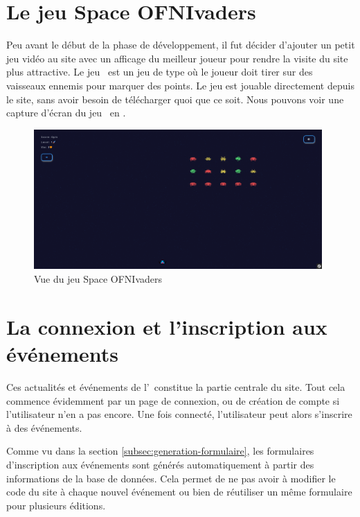 \section{Le jeu Space OFNIvaders}
\label{sec:jeu}

Peu avant le début de la phase de développement, il fut décider d'ajouter un petit jeu vidéo au site avec un afficage du meilleur joueur pour rendre la visite du site plus attractive. Le jeu \game\ est un jeu de type  où le joueur doit tirer sur des vaisseaux ennemis pour marquer des points. Le jeu est jouable directement depuis le site, sans avoir besoin de télécharger quoi que ce soit. Nous pouvons voir une capture d'écran du jeu \game\ en .
\bigskip


\begin{figure}[h]
    \centering
    \includegraphics[width=11cm]{assets/pictures/game.png}
    \caption{Vue du jeu Space OFNIvaders}
    \label{fig:game}
\end{figure}
\bigskip


\section{La connexion et l'inscription aux événements}
\label{sec:connexion-inscription}

Ces actualités et événements de l'\ofni\ constitue la partie centrale du site. Tout cela commence évidemment par un page de connexion, ou de création de compte si l'utilisateur n'en a pas encore. Une fois connecté, l'utilisateur peut alors s'inscrire à des événements.

Comme vu dans la section \ref{subsec:generation-formulaire}, les formulaires d'inscription aux événements sont générés automatiquement à partir des informations de la base de données. Cela permet de ne pas avoir à modifier le code du site à chaque nouvel événement ou bien de réutiliser un même formulaire pour plusieurs éditions.
\bigskip

